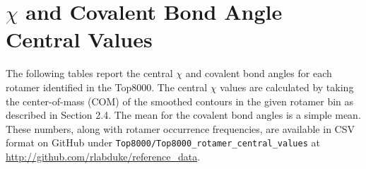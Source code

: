 \section{$\chi$ and Covalent Bond Angle Central Values}
The following tables report the central $\chi$ and covalent bond angles for each rotamer identified in the Top8000. The central $\chi$ values are calculated by taking the center-of-mass (COM) of the smoothed contours in the given rotamer bin as described in Section 2.4. The mean for the covalent bond angles is a simple mean. These numbers, along with rotamer occurrence frequencies, are available in CSV format on GitHub under \texttt{Top8000/Top8000\_rotamer\_central\_values} at \url{http://github.com/rlabduke/reference_data}.


\begin{longtable}{ c c }


\end{longtable}
